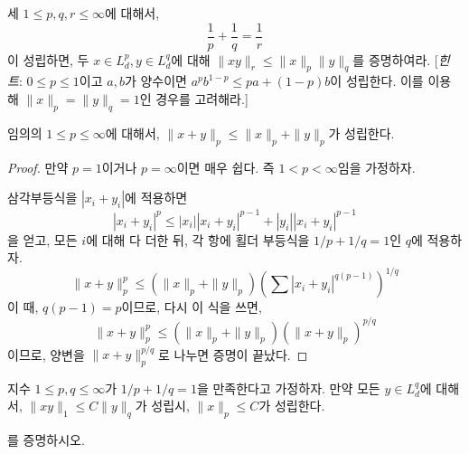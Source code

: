 \begin{exercise}
\label{exer:genholder}
    세 $1 \leq p, q, r \leq \infty$에 대해서,
    \begin{equation*}
        \frac{1}{p} + \frac{1}{q} = \frac{1}{r}
    \end{equation*}
    이 성립하면, 두 $x \in L^p_d, y \in L^q_d$에 대해 $\|xy\|_r \leq \|x\|_p\|y\|_q$를 증명하여라.
    [\textit{힌트}: $0 \leq p \leq 1$이고 $a, b$가 양수이면 $a^pb^{1 - p} \leq p a + (1 - p) b$이 성립한다. 이를 이용해 $\|x\|_p = \|y\|_q = 1$인 경우를 고려해라.]
\end{exercise}

\begin{theorem}[Minkowski]
\label{thm:minkowineq}
    임의의 $1 \leq p \leq \infty$에 대해서, $\|x + y\|_p \leq \|x\|_p + \|y\|_p$가 성립한다.
\end{theorem}
\begin{proof}
    만약 $p = 1$이거나 $p = \infty$이면 매우 쉽다.
    즉 $1 < p < \infty$임을 가정하자.

    삼각부등식을 $|x_i + y_i|$에 적용하면
    \begin{equation*}
        |x_i + y_i|^p \leq |x_i| |x_i + y_i|^{p - 1} + |y_i| |x_i + y_i|^{p - 1}
    \end{equation*}
    을 얻고, 모든 $i$에 대해 다 더한 뒤, 각 항에 횔더 부등식을 $1/p + 1/q = 1$인 $q$에 적용하자.
    \begin{equation*}
        \|x + y\|^p_p \leq (\|x\|_p + \|y\|_p) \left(\sum |x_i+y_i|^{q (p - 1)} \right)^{1/q} 
    \end{equation*}
    이 때, $q(p - 1) = p$이므로, 다시 이 식을 쓰면,
    \begin{equation*}
        \|x + y\|^p_p \leq (\|x\|_p + \|y\|_p) (\|x + y\|_p)^{p/q}
    \end{equation*}
    이므로, 양변을 $\|x + y\|^{p/q}_p$로 나누면 증명이 끝났다.
\end{proof}

\begin{theorem}
\label{thm:holderconv}
    지수 $1 \leq p, q \leq \infty$가 $1/p + 1/q = 1$을 만족한다고 가정하자.
    만약 모든 $y \in L^q_d$에 대해서, $\|xy\|_1 \leq C \|y\|_q$가 성립시, $\|x\|_p \leq C$가 성립한다.
     
\end{theorem}
\begin{exercise}
    를 증명하시오.
\end{exercise}

